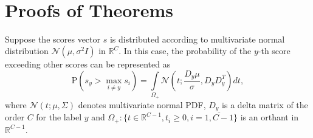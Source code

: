 \documentclass[nohyperref]{article}
\theoremstyle{plain}
\theoremstyle{definition}
\theoremstyle{remark}
\begin{document}




\newpage
~
\newpage

\theoremstyle{plain}
\newtheorem{manualtheoreminner}{Theorem}
\newenvironment{manualtheorem}[1]{\renewcommand\themanualtheoreminner{#1}\manualtheoreminner
}{\endmanualtheoreminner}

\appendix
\section{Proofs of Theorems}
\begin{manualtheorem}{4.2}
Suppose the scores vector $s$ is distributed according to multivariate normal distribution $\mathcal{N}(\mu, \sigma^2 I)$ in $\mathbb{R}^C$. In this case, the probability of the $y$-th score exceeding other scores can be represented as
\begin{equation}
    \mathrm{P}(s_y > \max\limits_{i \ne y} s_i) = \int\limits_{\Omega_+}\mathcal{N}(t; \frac{D_y\mu}{\sigma}, D_yD_y^T) dt,
    \label{eq:app-exact-comp}
\end{equation}
where $\mathcal{N}(t; \mu, \Sigma)$ denotes multivariate normal PDF, $D_y$ is a delta matrix of the order $C$ for the label $y$ and $\Omega_+: \{t \in \mathbb{R}^{C-1}, t_i \ge 0, i = \overline{1,C-1}\}$ is an orthant in $\mathbb{R}^{C-1}$.
\end{manualtheorem}
\end{document}
